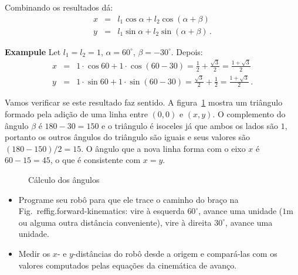 Combinando os resultados dá:
\begin{eqnarray*}
x &=& l_1 \cos \alpha + l_2 \cos(\alpha + \beta)\\
y &=& l_1 \sin \alpha + l_2 \sin(\alpha + \beta)\,.
\end{eqnarray*}

\noindent\textbf{Exampule} Let $l_1 = l_2 = 1$, $\alpha = 60^{\circ}$, $\beta = -30^{\circ}$. Depois:
\begin{eqnarray*}
x &=& 1\cdot\cos 60 + 1\cdot\cos(60-30) = \frac{1}{2} + \frac{\sqrt{3}}{2} = \frac{1+\sqrt{3}}{2}\\
y &=& 1\cdot\sin 60 + 1\cdot\sin(60-30) = \frac{\sqrt{3}}{2} + \frac{1}{2} = \frac{1+\sqrt{3}}{2}\,.
\end{eqnarray*}

Vamos verificar se este resultado faz sentido. A figura~\ref{fig.kinematics-triangle} mostra um triângulo formado pela adição de uma linha entre $(0,0)$ e $(x,y)$. O complemento do ângulo $\beta$ é $180-30=150$ e o triângulo é isoceles já que ambos os lados são $1$, portanto os outros ângulos do triângulo são iguais e seus valores são $(180-150)/2=15$. O ângulo que a nova linha forma com o eixo $x$ é $60-15=45$, o que é consistente com $x=y$.

\begin{figure}
\begin{center}
\end{center}
\caption{Cálculo dos ângulos}\label{fig.kinematics-triangle}
\end{figure}

\begin{framed}
\begin{itemize}
\item Programe seu robô para que ele trace o caminho do braço na Fig.~ref{fig.forward-kinematics}: vire à esquerda $60^{\circ}$, avance uma unidade ($1$m ou alguma outra distância conveniente), vire à direita $30^{\circ}$, avance uma unidade.
\item Medir os $x$- e $y$-distâncias do robô desde a origem e compará-las com os valores computados pelas equações da cinemática de avanço.
\end{itemize}
\end{framed}

